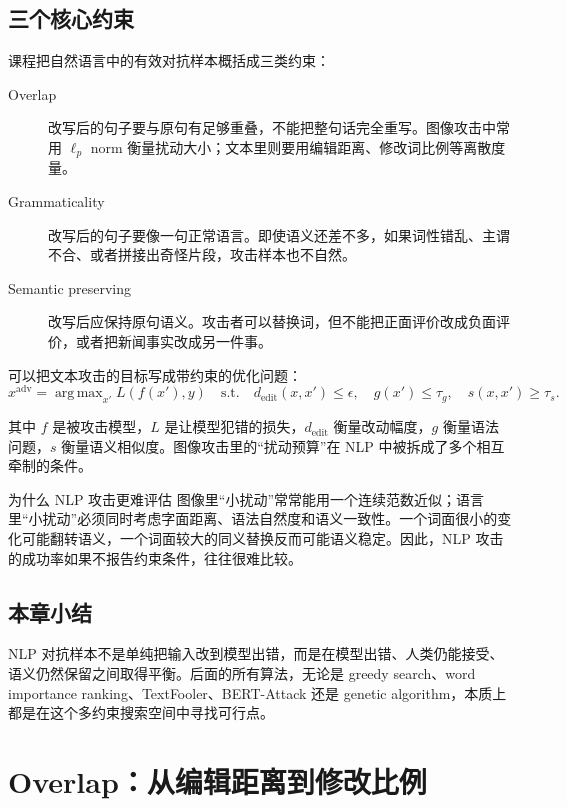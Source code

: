 \documentclass[a4paper]{article}
\DeclareMathOperator*{\argmax}{arg\,max}
\begin{document}
\subsection{三个核心约束}

课程把自然语言中的有效对抗样本概括成三类约束：

\begin{description}
    \item[Overlap] 改写后的句子要与原句有足够重叠，不能把整句话完全重写。图像攻击中常用 $\ell_p$ norm 衡量扰动大小；文本里则要用编辑距离、修改词比例等离散度量。
    \item[Grammaticality] 改写后的句子要像一句正常语言。即使语义还差不多，如果词性错乱、主谓不合、或者拼接出奇怪片段，攻击样本也不自然。
    \item[Semantic preserving] 改写后应保持原句语义。攻击者可以替换词，但不能把正面评价改成负面评价，或者把新闻事实改成另一件事。
\end{description}

可以把文本攻击的目标写成带约束的优化问题：
\[
x^{\mathrm{adv}}=\argmax_{x'} L(f(x'),y)
\quad
\text{s.t.}\quad
d_{\mathrm{edit}}(x,x')\leq \epsilon,\quad
g(x')\leq \tau_g,\quad
s(x,x')\geq \tau_s.
\]

其中 $f$ 是被攻击模型，$L$ 是让模型犯错的损失，$d_{\mathrm{edit}}$ 衡量改动幅度，$g$ 衡量语法问题，$s$ 衡量语义相似度。图像攻击里的“扰动预算”在 NLP 中被拆成了多个相互牵制的条件。

\begin{importantbox}{为什么 NLP 攻击更难评估}
    图像里“小扰动”常常能用一个连续范数近似；语言里“小扰动”必须同时考虑字面距离、语法自然度和语义一致性。一个词面很小的变化可能翻转语义，一个词面较大的同义替换反而可能语义稳定。因此，NLP 攻击的成功率如果不报告约束条件，往往很难比较。
\end{importantbox}

\subsection{本章小结}

NLP 对抗样本不是单纯把输入改到模型出错，而是在模型出错、人类仍能接受、语义仍然保留之间取得平衡。后面的所有算法，无论是 greedy search、word importance ranking、TextFooler、BERT-Attack 还是 genetic algorithm，本质上都是在这个多约束搜索空间中寻找可行点。

\section{Overlap：从编辑距离到修改比例}
\end{document}

